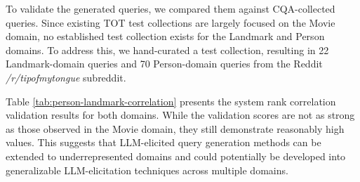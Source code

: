 To validate the generated queries, we compared them against CQA-collected queries. Since existing TOT test collections are largely focused on the Movie domain, no established test collection exists for the Landmark and Person domains. To address this, we hand-curated a test collection, resulting in 22 Landmark-domain queries and 70 Person-domain queries from the Reddit \textit{/r/tipofmytongue} subreddit.

Table \ref{tab:person-landmark-correlation} presents the system rank correlation validation results for both domains. While the validation scores are not as strong as those observed in the Movie domain, they still demonstrate reasonably high values. This suggests that LLM-elicited query generation methods can be extended to underrepresented domains and could potentially be developed into generalizable LLM-elicitation techniques across multiple domains.


